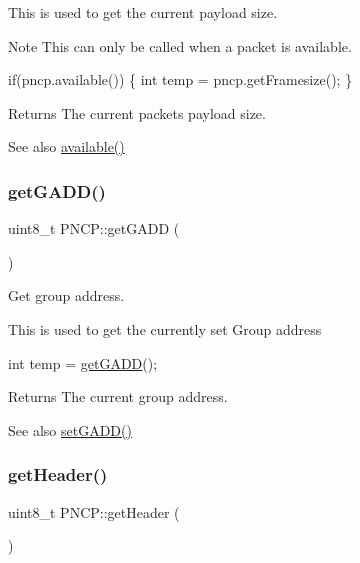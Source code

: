 This is used to get the current payload size. \begin{DoxyNote}{Note}
This can only be called when a packet is available. 
\begin{DoxyCode}
\textcolor{keywordflow}{if}(pncp.available())
\{
  \textcolor{keywordtype}{int} temp = pncp.getFramesize();
\}
\end{DoxyCode}
 
\end{DoxyNote}
\begin{DoxyReturn}{Returns}
The current packets payload size. 
\end{DoxyReturn}
\begin{DoxySeeAlso}{See also}
\hyperlink{class_p_n_c_p_a153136448f88a3d2ac580c329620aea4}{available()} 
\end{DoxySeeAlso}
\mbox{\label{class_p_n_c_p_ae885bf46891dfdc36def5b8e8337f5b8}} 
\subsubsection{\texorpdfstring{get\+G\+A\+D\+D()}{getGADD()}}
{\footnotesize\ttfamily uint8\+\_\+t P\+N\+C\+P\+::get\+G\+A\+DD (\begin{DoxyParamCaption}{ }\end{DoxyParamCaption})}



Get group address. 

This is used to get the currently set Group address 
\begin{DoxyCode}
\textcolor{keywordtype}{int} temp = \hyperlink{class_p_n_c_p_ae885bf46891dfdc36def5b8e8337f5b8}{getGADD}();
\end{DoxyCode}
 \begin{DoxyReturn}{Returns}
The current group address. 
\end{DoxyReturn}
\begin{DoxySeeAlso}{See also}
\hyperlink{class_p_n_c_p_a14efa4c46289d86be1a49f8e5594f396}{set\+G\+A\+D\+D()} 
\end{DoxySeeAlso}
\mbox{\label{class_p_n_c_p_aa6e0bdee89e847ff9e055868d042c538}} 
\subsubsection{\texorpdfstring{get\+Header()}{getHeader()}}
{\footnotesize\ttfamily uint8\+\_\+t P\+N\+C\+P\+::get\+Header (\begin{DoxyParamCaption}{ }\end{DoxyParamCaption})}



